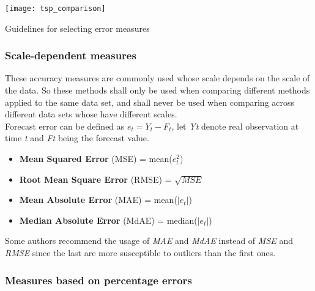 \begin{table}[h] \begin{center} \leavevmode
\texttt{[image: tsp\_comparison]} \caption{Guidelines for
selecting error measures \cite{Armstrong199269} } \label{fig:ts_error_selection}
\end{center} \end{table}

\subsubsection{Scale-dependent measures}

These accuracy measures are commonly used whose scale depends on the scale of
the data. So these methods shall only be used when comparing different methods
applied to the same data set, and shall never be used when comparing across
different data sets whose have different scales.
\\

Forecast error can be defined as \begin{math} e_t = Y_t - F_t \end{math}, let
\emph{Yt} denote real observation at time \emph{t} and \emph{Ft} being the
forecast value.
\begin{itemize}
  \item \textbf{Mean Squared Error} (MSE) = mean(\begin{math} e_t^2 \end{math})
    \item \textbf{Root Mean Square Error} (RMSE) = \begin{math}
      \sqrt{MSE}\end{math}
  \item \textbf{Mean Absolute Error} (MAE) = mean(\begin{math}
      \left|e_t\right|\end{math})
  \item \textbf{Median Absolute Error} (MdAE) = median(\begin{math}
      \left|e_t\right|\end{math})

\end{itemize}

Some authors \cite{Armstrong:2001fj} recommend the usage of \emph{MAE} and
\emph{MdAE} instead of \emph{MSE} and \emph{RMSE} since the last are more
susceptible to outliers than the first ones.


\subsubsection{Measures based on percentage errors}

